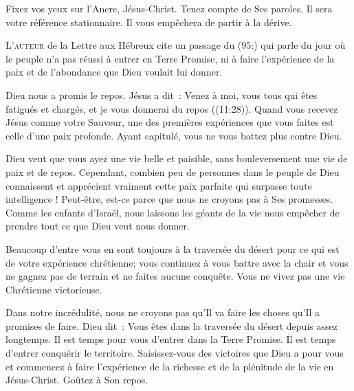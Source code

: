 Fixez vos yeux sur l'Ancre, Jésus-Christ. Tenez compte de Ses paroles.
 Il sera votre référence stationnaire.
 Il vous empêchera de partir à la dérive. 

\dvrule






\lettrine{L}{'auteur} de la Lettre aux Hébreux
 cite un passage du (95:) qui parle du jour où le peuple
 n'a pas réussi à entrer en Terre Promise, ni à faire l'expérience
 de la paix et de l'abondance que Dieu voulait lui donner. 

Dieu nous a promis le repos. Jésus a dit~: 
 \og Venez à moi, vous tous qui êtes fatigués et chargés,
 et je vous donnerai du repos \fg{} ((11:28)).
 Quand vous recevez Jésus comme votre Sauveur, une des premières expériences
 que vous faites est celle d'une paix profonde.
 Ayant capitulé, vous ne vous battez plus contre Dieu. 


Dieu veut que vous ayez une vie belle et paisible, sans bouleversement
 \ocadr une vie de paix et de repos.
 Cependant, combien peu de personnes dans le peuple de Dieu connaissent
 et apprécient vraiment cette paix parfaite qui surpasse toute intelligence !
 Peut-être,  est-ce parce que nous ne croyons pas
 à Ses promesses.
 Comme les enfants d'Israël, nous laissons les géants de la vie
 nous empêcher de prendre tout ce que Dieu veut nous donner. 

Beaucoup d'entre vous en sont toujours à la traversée du désert
 pour ce qui est de votre expérience chrétienne;
 vous continuez à vous battre avec la chair et vous ne gagnez pas de terrain
 et ne faites aucune conquête. Vous ne vivez pas
 une vie Chrétienne 
 victorieuse. 

Dans notre incrédulité, nous ne croyons pas qu'Il va faire les choses
 qu'Il a promises 
 de faire.
 Dieu dit~: 
 \og Vous êtes dans la traversée du désert depuis assez longtemps.
 Il est temps pour vous d'entrer dans la Terre Promise.
 Il est temps d'entrer conquérir le territoire. \fg{}
 Saisissez-vous 
 des victoires que Dieu a pour vous et commencez à faire l'expérience
 de la richesse et de la plénitude de la vie en Jésus-Christ.
 Goûtez à Son repos. 


